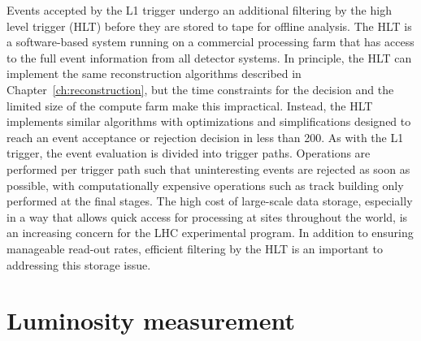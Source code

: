 Events accepted by the L1 trigger undergo an additional filtering 
by the high level trigger (HLT) before they are stored to tape for offline analysis.
The HLT is a software-based system running on a commercial processing farm that
has access to the full event information from all detector systems. In principle,
the HLT can implement the same reconstruction algorithms described in Chapter~\ref{ch:reconstruction},
but the time constraints for the decision and the limited size of the compute farm
make this impractical. Instead, the HLT implements similar algorithms with
optimizations and simplifications designed to reach an event acceptance or rejection
decision in less than 200\mus. As with the L1 trigger, the event evaluation is
divided into trigger paths. Operations are performed per trigger path such that
uninteresting events are rejected as soon as possible, with computationally
expensive operations such as track building only performed at the final stages.
The high cost of large-scale data storage, especially in a way that allows quick access 
for processing at sites throughout the world, is an increasing concern for the
LHC experimental program. In addition to ensuring manageable read-out rates,
efficient filtering by the HLT is an important to addressing this storage issue.

\label{sec:triggering}
\section{Luminosity measurement}


